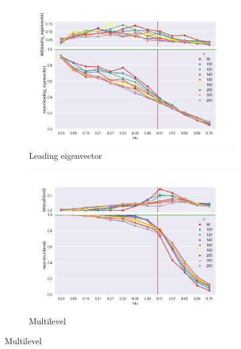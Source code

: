 \begin{figure}
    \begin{subfigure}[b]{0.32\textwidth}
        \includegraphics[width=\textwidth]{fig/ami_vs_mu_leading_eigenvector}
        \caption{Leading eigenvector}
        \label{fig:tiger}
    \end{subfigure}
    \qquad
    \begin{subfigure}[b]{0.32\textwidth}
        \includegraphics[width=\textwidth]{fig/ami_vs_mu_multilevel}
        \caption{Multilevel}
        \label{fig:mouse}
    \end{subfigure}
    

\end{figure}
